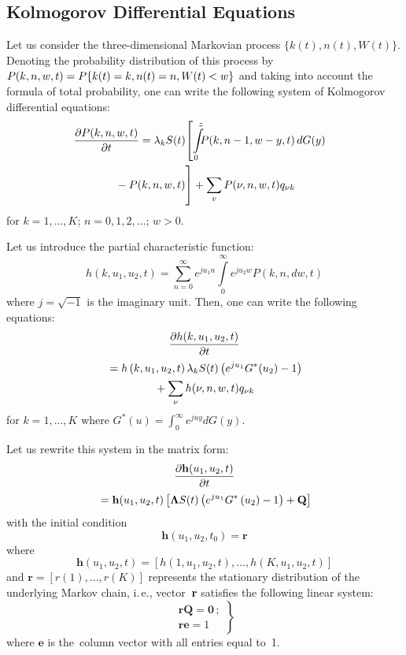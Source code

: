 \begin{multicols}{2}
\section{Kolmogorov Differential Equations}

\noindent
Let us consider the three-dimensional Markovian process $\{k(t),n(t),W(t)\}$. 
Denoting the probability distribution of this process by 
$P(k,n,w,t)=P\{k(t)\linebreak =k,n(t)=n,W(t)<w\}$ and taking into account the formula 
of total probability, one can write the following system of Kolmogorov 
differential equations:
\begin{multline*}
\hspace*{-9pt}\fr{\partial P(k,n,w,t)}{\partial t}=\lambda_kS(t)\!\left[
\int\limits_0^z\!\!\! P(k,n-1,w-y,t)\,dG(y){}\right.\hspace*{-1pt}\\
\left.{}-P(k,n,w,t)
\vphantom{\int\limits_0^z}\right]
+\sum_vP(\nu,n,w,t)q_{\nu k}
\end{multline*}
for $k=1,\ldots , K$; $n=0,1,2,\ldots$; $w>0$.

Let us introduce the partial characteristic function:
$$
h(k,u_1,u_2,t)=\sum\limits_{n=0}^{\infty}e^{ju_1n}
\int\limits_0^\infty e^{ju_2w}P(k,n,dw,t)
$$
where $j=\sqrt{-1}$ is the imaginary unit. Then, one can write the following equations:
\begin{multline*}
\displaystyle\frac{\displaystyle \partial h(k,u_1,u_2,t)\mathstrut}{\displaystyle \partial t\mathstrut}\\
{}=
h\left(k,u_1,u_2,t\right)\lambda_kS(t)\left( e^{ju_1}G^*(u_2)-1\right) \\
{}+
\sum\limits_{\nu}h(\nu,n,w,t)q_{\nu k}
\end{multline*}
for $k=1,\ldots,K$ where $G^*(u)=\int\nolimits_0^\infty e^{juy}dG(y)$.

Let us rewrite this system in the matrix form:
\begin{multline}
\label{eq2-p}
\displaystyle\frac{\displaystyle \partial\mathbf{h}(u_1,u_2,t)\mathstrut}{\displaystyle \partial t\mathstrut}\\
{}=
\mathbf{h}(u_1,u_2,t)\left[
\mathbf{\Lambda} S(t)\left( e^{ju_1}G^*\left(u_2\right)-1\right) +\mathbf{Q}\right]
\end{multline}
with the initial condition
\begin{equation}
\label{eq3}
{\mathbf{h}}\left(u_1,u_2,t_0\right)=\mathbf{r}
\end{equation}
where
$$
\mathbf{h}\left(u_1,u_2,t\right)=\left[h\left(1,u_1,u_2,t\right),\ldots,
h\left(K,u_1,u_2,t\right)\right]
$$
and ${\mathbf{r}}=[r(1),\ldots,r(K)]$ represents the stationary 
distribution of the underlying Markov chain, i.\,e., 
vector~$\bf{r}$ satisfies the following linear system:
\begin{equation}
\label{eq4}
\left.
\begin{array}{l}
\mathbf{rQ}=\mathbf{0}\,; \\[6pt]
\mathbf{re}=1
\end{array}
\right\}
\end{equation}
where $\mathbf{e}$ is the~column vector with all entries equal to~1.


\end{multicols}
